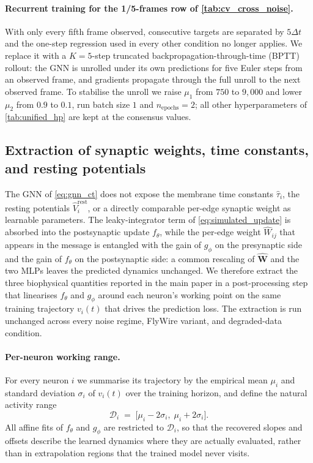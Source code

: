 \documentclass{article}
\begin{document}
\paragraph{Recurrent training for the 1/5-frames row of \cref{tab:cv_cross_noise}.}
With only every fifth frame observed, consecutive targets are separated by $5\Delta t$ and the one-step regression used in every other condition no longer applies. We replace it with a $K\!=\!5$-step truncated backpropagation-through-time (BPTT) rollout: the GNN is unrolled under its own predictions for five Euler steps from an observed frame, and gradients propagate through the full unroll to the next observed frame. To stabilise the unroll we raise $\mu_1$ from $750$ to $9{,}000$ and lower $\mu_2$ from $0.9$ to $0.1$, run batch size $1$ and $n_{\text{epochs}}\!=\!2$; all other hyperparameters of \cref{tab:unified_hp} are kept at the consensus values.







\subsection{Extraction of synaptic weights, time constants, and resting potentials}
\label{app:extraction}

The GNN of \cref{eq:gnn_ct} does not expose the membrane time
constants $\hat\tau_i$, the resting potentials
$\hat V^{\mathrm{rest}}_i$, or a directly comparable per-edge
synaptic weight as learnable parameters. The leaky-integrator term
of \cref{eq:simulated_update} is absorbed into the postsynaptic
update $f_\theta$, while the per-edge weight $\hat{W}_{ij}$
that appears in the message is entangled with the gain of $g_\phi$
on the presynaptic side and the gain of $f_\theta$ on the
postsynaptic side: a common rescaling of $\hat{\mathbf{W}}$ and the
two MLPs leaves the predicted dynamics unchanged. We therefore
extract the three biophysical quantities reported in the main paper
in a post-processing step that linearises $f_\theta$ and $g_\phi$
around each neuron's working point on the same training trajectory
$v_i(t)$ that drives the prediction loss. The extraction is run
unchanged across every noise regime, FlyWire variant, and
degraded-data condition.

\paragraph{Per-neuron working range.}
For every neuron $i$ we summarise its trajectory by the empirical
mean $\mu_i$ and standard deviation $\sigma_i$ of $v_i(t)$ over
the training horizon, and define the natural activity range
\begin{equation}
    \mathcal{D}_i \;=\; \big[\mu_i - 2\sigma_i,\; \mu_i + 2\sigma_i\big].
    \label{eq:extraction_range}
\end{equation}
All affine fits of $f_\theta$ and $g_\phi$ are restricted to
$\mathcal{D}_i$, so that the recovered slopes and offsets describe
the learned dynamics where they are actually evaluated, rather than
in extrapolation regions that the trained model never visits.
\end{document}
